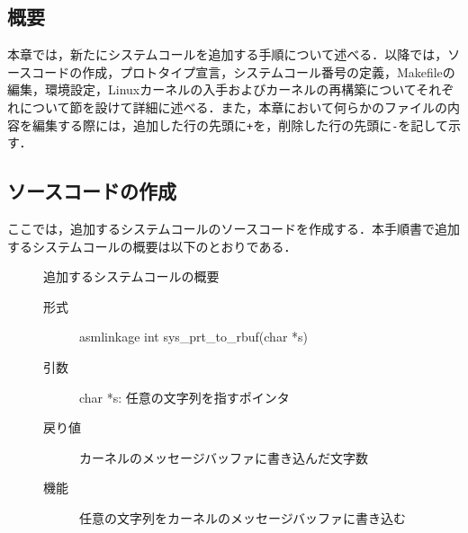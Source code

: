 \documentclass[12pt]{jsarticle}
\begin{document}
\subsection{概要}
本章では，新たにシステムコールを追加する手順について述べる．以降では，ソースコードの作成，プロトタイプ宣言，システムコール番号の定義，Makefileの編集，環境設定，Linuxカーネルの入手およびカーネルの再構築についてそれぞれについて節を設けて詳細に述べる．また，本章において何らかのファイルの内容を編集する際には，追加した行の先頭に\verb|+|を，削除した行の先頭に\verb|-|を記して示す．
\subsection{ソースコードの作成}
ここでは，追加するシステムコールのソースコードを作成する．本手順書で追加するシステムコールの概要は以下のとおりである．
\newpage
\begin{description}
  \item[] 追加するシステムコールの概要
  \begin{description}
  \item[形式] asmlinkage int sys\_prt\_to\_rbuf(char *s)
  \item[引数] char *s: 任意の文字列を指すポインタ
  \item[戻り値] カーネルのメッセージバッファに書き込んだ文字数
  \item[機能] 任意の文字列をカーネルのメッセージバッファに書き込む
  \end{description}
\end{description}
\end{document}
